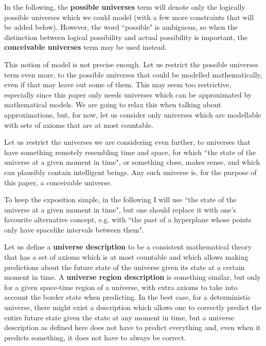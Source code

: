\documentclass[a4paper
,draft
]{article}
\newcommand{\definitie}[1]{\textbf{#1}}
\newcommand{\ghilimele}[1]{``#1"}
\begin{document}
In the following, the \definitie{possible universes} term will denote
only the logically possible universes which we could model (with a few
more constraints that will be added below). However, the word
\ghilimele{possible} is ambiguous, so when the distinction between logical
possibility and actual possibility is important, the
\definitie{conceivable universes} term may be used instead.

This notion of model is not precise enough.
Let us restrict the possible universes term even more,
to the possible universes that could be modelled mathematically,
even if that may leave out some of them.
This may seem too restrictive,
especially since this paper only needs universes which can be approximated
by mathematical models.
We are going to relax this when talking about approximations, but, for now,
let us consider only universes
which are modellable with sets of axioms that are at most countable.

Let us restrict the universes we are considering even further, to universes that
have something remotely resembling time and space, for which
\ghilimele{the state of the universe at a given moment in time}, or something
close, makes sense, and which can plausibly contain intelligent beings.
Any such universe is, for the purpose of this paper, a conceivable universe.

To keep the exposition simple, in the following I will use
\ghilimele{the state of the universe at a given moment in time},
but one should replace it with one's favourite alternative concept, e.g.
with \ghilimele{the past of a hyperplane whose points only have spacelike
intervals between them}.

Let us define a \definitie{universe description} to be a
consistent mathematical theory that has
a set of axioms which is at most countable and which allows making
predictions about the future state of the universe given its state
at a certain moment in time. A \definitie{universe region description}
is something similar, but only for a given space-time region of a universe,
with extra axioms to take into account the border state when predicting.
In the best case, for a deterministic universe, there might exist
a description which allows one to correctly predict the entire future state
given the state at any moment in time, but a universe description
as defined here does not have to predict everything and,
even when it predicts something, it does not have to always be correct.
\end{document}
